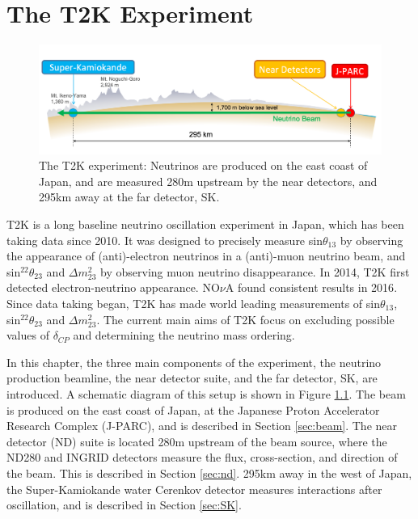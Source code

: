 \chapter{The T2K Experiment}\label{sec:T2K}

\begin{figure}[h]
\centering
\includegraphics*[width=1.0\textwidth,clip]{figs/t2kcrosssection}
\caption{The T2K experiment: Neutrinos are produced on the east coast of Japan, and are measured 280m upstream by the near detectors, and 295km away at the far detector, SK.} \label{t2kcrosssec}
\end{figure}

T2K is a long baseline neutrino oscillation experiment in Japan, which has been taking data since 2010. It was designed to precisely measure sin$\theta_{13}$ by observing the appearance of (anti)-electron neutrinos in a (anti)-muon neutrino beam, and sin$^22\theta_{23}$ and $\Delta m^2_{23}$ by observing muon neutrino disappearance. In 2014, T2K first detected electron-neutrino appearance\cite{nova2016}. NO$\nu$A found consistent results in 2016\cite{PhysRevLett.112.061802}. Since data taking began, T2K has made world leading measurements of sin$\theta_{13}$, sin$^22\theta_{23}$ and $\Delta m^2_{23}$. The current main aims of T2K focus on excluding possible values of $\delta_{CP}$ and determining the neutrino mass ordering.

In this chapter, the three main components of the experiment, the neutrino production beamline, the near detector suite, and the far detector, SK, are introduced. A schematic diagram of this setup is shown in Figure \ref{t2kcrosssec}. The beam is produced on the east coast of Japan, at the Japanese Proton Accelerator Research Complex (J-PARC), and is described in Section \ref{sec:beam}. The near detector (ND) suite is located 280m upstream of the beam source, where the ND280 and INGRID detectors measure the flux, cross-section, and direction of the beam. This is described in Section \ref{sec:nd}. 295km away in the west of Japan, the Super-Kamiokande water Cerenkov detector measures interactions after oscillation, and is described in Section \ref{sec:SK}.

